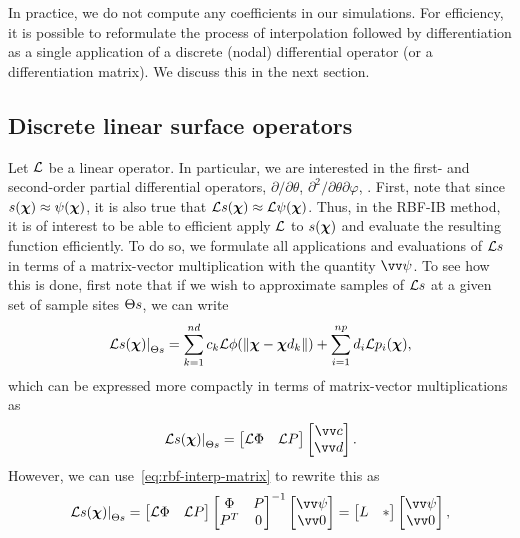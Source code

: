 In practice, we do not compute any coefficients in our simulations. For efficiency, it is possible to reformulate
the process of interpolation followed by differentiation as a single application of a discrete (nodal)
differential operator (or a differentiation matrix). We discuss this in the next section.

\subsection{Discrete linear surface operators}

Let $\mathcal{L}$ be a linear operator. In particular, we are interested in the first- and second-order partial
differential operators, $\partial/\partial\theta$, $\partial^2/\partial\theta\partial\varphi$, . First,
note that since $s(\boldsymbol{\chi}) \approx \psi(\boldsymbol{\chi})$, it is also true that $\mathcal{L} s(\boldsymbol{\chi}) \approx \mathcal{L} \psi(\boldsymbol{\chi})$. Thus, in the
RBF-IB method, it is of interest to be able to efficient apply $\mathcal{L}$ to $s(\boldsymbol{\chi})$ and evaluate the resulting
function efficiently. To do so, we formulate all applications and evaluations of $\mathcal{L} s$ in terms of a
matrix-vector multiplication with the quantity $\arr{\psi}$. To see how this is done, first note that if we wish
to approximate samples of $\mathcal{L} s$ at a given set of sample sites $\sample\sites$, we can write
\begin{align}
\left.\L s (\Xp) \right|_{\sample\sites}
    = \sum_{k=1}^{\data\cardinality} c_k \L \phi(\|\Xp-\data\Xp_k\|)
    + \sum_{i=1}^{\poly\cardinality} d_i \L p_i(\Xp),
\end{align}
which can be expressed more compactly in terms of matrix-vector multiplications as
\begin{align}
\left.\L s (\Xp) \right|_{\sample\sites} =
    \begin{bmatrix}
    \L \Phi & \L P
    \end{bmatrix}\begin{bmatrix}
    \arr{c} \\
    \arr{d}
    \end{bmatrix}.
\end{align}
However, we can use~\eqref{eq:rbf-interp-matrix} to rewrite this as
\begin{align}
\left.\L s (\Xp) \right|_{\sample\sites} =
    \begin{bmatrix}
    \L \Phi & \L P
    \end{bmatrix}\begin{bmatrix}
    \Phi & P \\
    P^T & 0
    \end{bmatrix}^{-1}\begin{bmatrix}
    \arr{\psi} \\
    \arr{0}
    \end{bmatrix} =
    \begin{bmatrix}
    L & \ast
    \end{bmatrix}\begin{bmatrix}
    \arr{\psi}\\
    \arr{0}
    \end{bmatrix},
\end{align}
